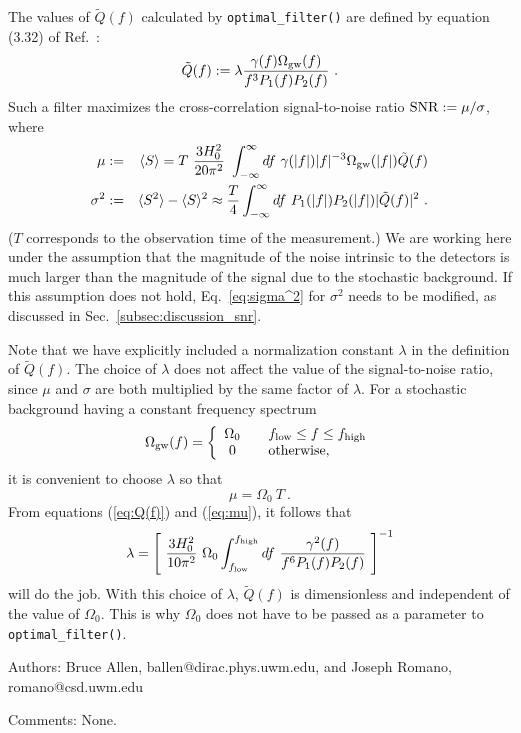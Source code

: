 The values of $\tilde Q(f)$ calculated by {\tt optimal\_filter()}
are defined by equation (3.32) of Ref.~\cite{AllenReview}:
%
\begin{equation}
\tilde Q(f):=\lambda{\gamma(f)\Omega_{\rm gw}(f)\over f^3 P_1(f) P_2(f)}\ .
\label{eq:Q(f)}
\end{equation}
%
Such a filter maximizes the cross-correlation signal-to-noise ratio 
%
%
${\rm SNR}:=\mu/\sigma$, where
%
\begin{eqnarray}
\mu&:=&\langle S\rangle=T\ {3H_0^2\over 20 \pi^2}\ \int_{-\infty}^\infty 
df\ \gamma(|f|)|f|^{-3}\Omega_{\rm gw}(|f|)\tilde Q(f)
\label{eq:mu}\\
\sigma^2&:=&\langle S^2\rangle-\langle S\rangle^2
\approx{T\over 4}\int_{-\infty}^\infty df\ P_1(|f|) P_2(|f|)
|\tilde Q(f)|^2\ .
\label{eq:sigma^2}
\end{eqnarray}
%
($T$ corresponds to the observation time of the measurement.)
We are working here under the assumption that the magnitude of the noise 
intrinsic to the detectors is much larger than the magnitude of the
signal due to the stochastic background.
If this assumption does not hold, Eq.~\ref{eq:sigma^2} for $\sigma^2$ 
needs to be modified, as discussed in Sec.~\ref{subsec:discussion_snr}.

Note that we have explicitly included a normalization constant 
$\lambda$ in the definition of $\tilde Q(f)$.
The choice of $\lambda$ does not affect the value of the signal-to-noise 
ratio, since $\mu$ and $\sigma$ are both multiplied by the same factor of 
$\lambda$.
For a stochastic background having a constant frequency spectrum
%
\[
\Omega_{\rm gw}(f)=\left\{
\begin{array}{cl}
\Omega_0 & \quad f_{\rm low}\le f \le f_{\rm high}\\
0        & \quad {\rm otherwise,}
\end{array}
\right.
\]
%
it is convenient to choose $\lambda$ so that 
%
\begin{equation}
\mu=\Omega_0\ T\ .
\end{equation}
%
From equations (\ref{eq:Q(f)}) and (\ref{eq:mu}), it follows that
%
\begin{equation}
\lambda=\left[\ {3H_0^2\over 10\pi^2}\ \Omega_0
\int_{f_{\rm low}}^{f_{\rm high}} df\ {\gamma^2(f)\over
f^6 P_1(f) P_2(f)}\ \right]^{-1}
\end{equation}
%
will do the job.
With this choice of $\lambda$, $\tilde Q(f)$ is dimensionless and
independent of the value of $\Omega_0$.
This is why $\Omega_0$ does not have to be passed as a parameter to
{\tt optimal\_filter()}.
%
\begin{description}
\item{Authors:}
Bruce Allen, ballen@dirac.phys.uwm.edu, and Joseph Romano, romano@csd.uwm.edu
\item{Comments:}
None.
\end{description}
\clearpage

